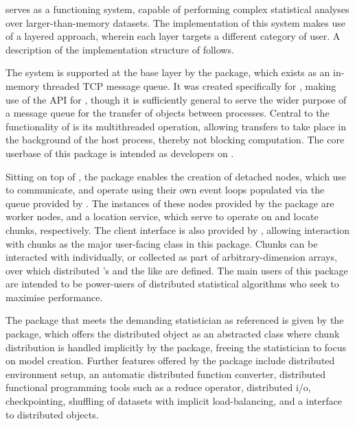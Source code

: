 \lsr serves as a functioning system, capable of performing complex statistical analyses over larger-than-memory datasets.
The implementation of this system makes use of a layered approach, wherein each layer targets a different category of user.
A description of the implementation structure of \lsr follows.

The system is supported at the base layer by the  package, which exists as an in-memory threaded TCP message queue.
It was created specifically for , making use of the  API for \R, though it is sufficiently general to serve the wider purpose of a message queue for the transfer of \R objects between \R processes.
Central to the functionality of  is its multithreaded operation, allowing transfers to take place in the background of the host \R process, thereby not blocking computation.
The core userbase of this package is intended as developers on \lsr.

Sitting on top of , the package  enables the creation of detached nodes, which use  to communicate, and operate using their own event loops populated via the queue provided by .
The instances of these nodes provided by the package are worker nodes, and a location service, which serve to operate on and locate chunks, respectively.
The client interface is also provided by , allowing interaction with chunks as the major user-facing class in this package.
Chunks can be interacted with individually, or collected as part of arbitrary-dimension arrays, over which distributed 's and the like are defined.
The main users of this package are intended to be power-users of distributed statistical algorithms who seek to maximise performance.

The package that meets the demanding statistician as referenced is given by the \lsr package, which offers the distributed object as an abstracted class where chunk distribution is handled implicitly by the package, freeing the statistician to focus on model creation. Further features offered by the package include distributed environment setup, an automatic distributed function converter, distributed functional programming tools such as a reduce operator, distributed i/o, checkpointing, shuffling of datasets with implicit load-balancing, and a  interface to distributed objects.
